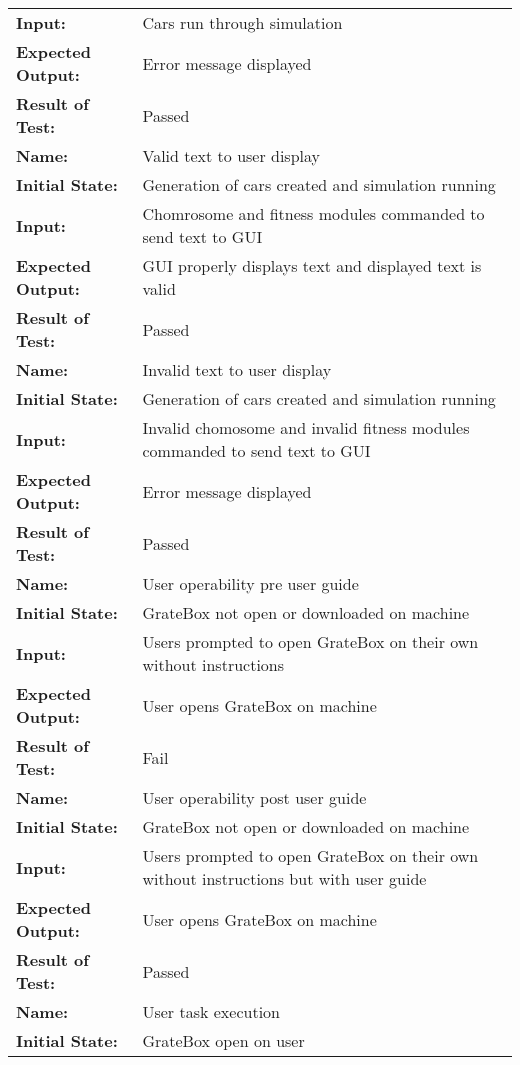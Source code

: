 \documentclass[12pt, titlepage]{article}
\begin{document}
\begin{center}
\begin{longtable}{ l | p{10cm} }
\textbf{Input:} & Cars run through simulation\\
\textbf{Expected Output:} & Error message displayed\\[0.6em]
\textbf{Result of Test:} & Passed\\
\hline
\rule{0pt}{1.5em}\textbf{Name:} & Valid text to user display\\
\textbf{Initial State:} & Generation of cars created and simulation running\\
\textbf{Input:} & Chomrosome and fitness modules commanded to send text to GUI\\
\textbf{Expected Output:} & GUI properly displays text and displayed text is valid\\[0.6em]
\textbf{Result of Test:} & Passed\\
\hline
\rule{0pt}{1.5em}\textbf{Name:} & Invalid text to user display\\
\textbf{Initial State:} & Generation of cars created and simulation running\\
\textbf{Input:} & Invalid chomosome and invalid fitness modules commanded to send text to GUI\\
\textbf{Expected Output:} & Error message displayed\\[0.6em]
\textbf{Result of Test:} & Passed\\
\hline
\rule{0pt}{1.5em}\textbf{Name:} & User operability pre user guide\\
\textbf{Initial State:} & GrateBox not open or downloaded on machine\\
\textbf{Input:} & Users prompted to open GrateBox on their own without instructions\\
\textbf{Expected Output:} & User opens GrateBox on machine\\[0.6em]
\textbf{Result of Test:} & Fail\\
\hline
\rule{0pt}{1.5em}\textbf{Name:} & User operability post user guide\\
\textbf{Initial State:} & GrateBox not open or downloaded on machine\\
\textbf{Input:} & Users prompted to open GrateBox on their own without instructions but with user guide\\
\textbf{Expected Output:} & User opens GrateBox on machine\\[0.6em]
\textbf{Result of Test:} & Passed\\
\hline
\rule{0pt}{1.5em}\textbf{Name:} & User task execution\\
\textbf{Initial State:} & GrateBox open on user\\

\end{longtable}
\end{center}
\end{document}
